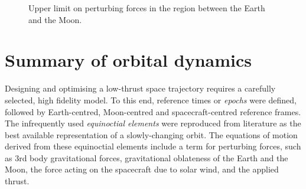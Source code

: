 \begin{figure}[h]
\centering
\def\svgwidth{\figurewidth}

\caption{Upper limit on perturbing forces in the region between the Earth and the Moon.} \label{fig:Perturbing-forces}
\end{figure}




\section{Summary of orbital dynamics} 

Designing and optimising a low-thrust space trajectory requires a carefully selected, high fidelity model. To this end, reference times or \emph{epochs} were defined, followed by Earth-centred, Moon-centred and spacecraft-centred reference frames. The infrequently used \emph{equinoctial elements} were reproduced from literature as the best available representation of a slowly-changing orbit. The equations of motion derived from these equinoctial elements include a term for perturbing forces, such as 3rd body gravitational forces, gravitational oblateness of the Earth and the Moon, the force acting on the spacecraft due to solar wind, and the applied thrust. %